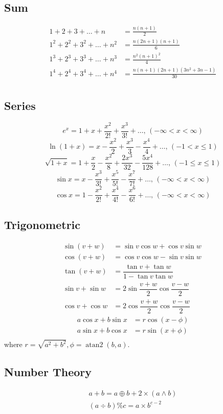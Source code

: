 \documentclass[A4 paper, 12pt, oneside]{article}
\begin{document}
\begin{landscape}
\begin{multicols}{2}
	\subsection{Sum}
	\begin{align*}
    	1 + 2 + 3 + \dots + n &= \frac{n(n+1)}{2} \\
    	1^2 + 2^2 + 3^2 + \dots + n^2 &= \frac{n(2n+1)(n+1)}{6} \\
    	1^3 + 2^3 + 3^3 + \dots + n^3 &= \frac{n^2(n+1)^2}{4} \\
    	1^4 + 2^4 + 3^4 + \dots + n^4 &= \frac{n(n+1)(2n+1)(3n^2 + 3n - 1)}{30} \\
    \end{align*}
    
    \subsection{Series}
    $$e^x = 1+x+\frac{x^2}{2!}+\frac{x^3}{3!}+\dots,\,(-\infty<x<\infty)$$
    $$\ln(1+x) = x-\frac{x^2}{2}+\frac{x^3}{3}-\frac{x^4}{4}+\dots,\,(-1<x\leq1)$$
    $$\sqrt{1+x} = 1+\frac{x}{2}-\frac{x^2}{8}+\frac{2x^3}{32}-\frac{5x^4}{128}+\dots,\,(-1\leq x\leq1)$$
    $$\sin x = x-\frac{x^3}{3!}+\frac{x^5}{5!}-\frac{x^7}{7!}+\dots,\,(-\infty<x<\infty)$$
    $$\cos x = 1-\frac{x^2}{2!}+\frac{x^4}{4!}-\frac{x^6}{6!}+\dots,\,(-\infty<x<\infty)$$
    
    \subsection{Trigonometric}
    \begin{align*}
        \sin(v+w)&= \sin v\cos w+\cos v\sin w \\
        \cos(v+w)&=\cos v\cos w-\sin v\sin w\ \\
        \tan(v+w)&=\dfrac{\tan v+\tan w}{1-\tan v\tan w} \\
        \sin v+\sin w&=2\sin\dfrac{v+w}{2}\cos\dfrac{v-w}{2} \\
        \cos v+\cos w&=2\cos\dfrac{v+w}{2}\cos\dfrac{v-w}{2} 
    \end{align*}
    \begin{align*}
        a\cos x+b\sin x&=r\cos(x-\phi)\\
        a\sin x+b\cos x&=r\sin(x+\phi)\\
    \end{align*}
    where $r=\sqrt{a^2+b^2}, \phi=\operatorname{atan2}(b,a)$.

    \subsection{Number Theory}
    \begin{align*}
        a + b = a \oplus b + 2 \times (a \wedge b) \\
        (a \div b) \% c = a \times b^{c - 2}
    \end{align*}


\end{multicols}
\end{landscape}
\end{document}
